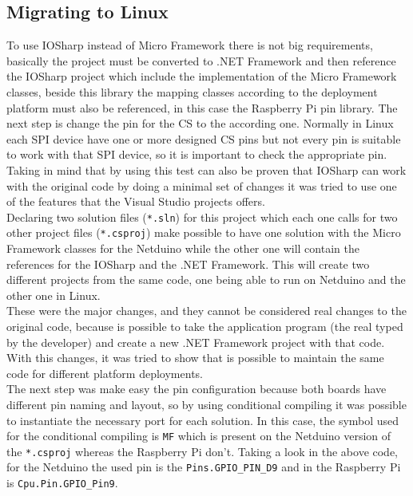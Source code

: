 \subsection{Migrating to Linux}\label{S:IOEx-SPI-Migrating-to-IOSharp}
To use IOSharp instead of Micro Framework there is not big requirements, basically the project must be converted to .NET Framework and then reference the IOSharp project which include the implementation of the Micro Framework classes, beside this library the mapping classes according to the deployment platform must also be referenced, in this case the Raspberry Pi pin library. The next step is change the pin for the \gls{CS} to the according one. Normally in Linux each SPI device have one or more designed \gls{CS} pins but not every pin is suitable to work with that SPI device, so it is important to check the appropriate pin.
\\
Taking in mind that by using this test can also be proven that IOSharp can work with the original code by doing a minimal set of changes it was tried to use one of the features that the Visual Studio projects offers.
\\
Declaring two solution files (\verb!*.sln!) for this project which each one calls for two other project files (\verb!*.csproj!) make possible to have one solution with the Micro Framework classes for the Netduino while the other one will contain the references for the IOSharp and the .NET Framework. This will create two different projects from the same code, one being able to run on Netduino and the other one in Linux.
\\
These were the major changes, and they cannot be considered real changes to the original code, because is possible to take the application program (the real typed by the developer) and create a new .NET Framework project with that code. With this changes, it was tried to show that is possible to maintain the same code for different platform deployments.
\\
The next step was make easy the pin configuration because both boards have different pin naming and layout, so by using conditional compiling it was possible to instantiate the necessary port for each solution. In this case, the symbol used for the conditional compiling is \verb!MF! which is present on the Netduino version of the \verb!*.csproj! whereas the Raspberry Pi don't. Taking a look in the above code, for the Netduino the used pin is the \verb!Pins.GPIO_PIN_D9! and in the Raspberry Pi is \verb!Cpu.Pin.GPIO_Pin9!.

